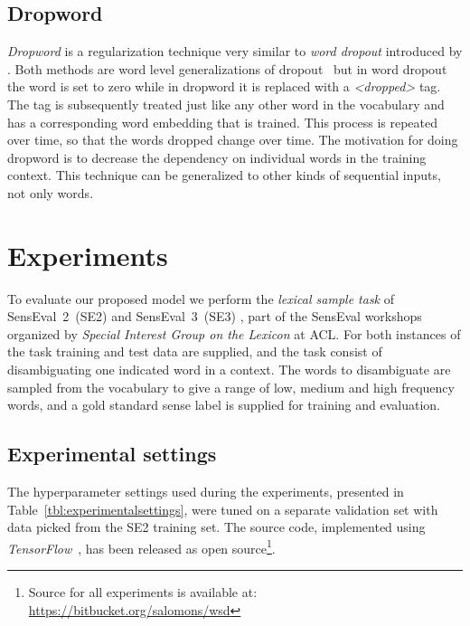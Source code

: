 \documentclass[11pt]{article}
\newcommand{\Tab}[1]{Table~\ref{#1}}
\def\SEtwo{SE2}
\def\SEthree{SE3}
\def\dropword{dropword}
\def\dropout{dropout}
\def\worddropout{word dropout}
\def\dropword{dropword}
\def\Dropword{Dropword}
\begin{document}
\subsection{\Dropword}
\emph{\Dropword{}} is a regularization technique very similar to \emph{\worddropout{}} introduced by . Both methods are word level generalizations of \dropout{}~\cite{srivastava2014dropout} but in \worddropout{} the word is set to zero while in \dropword{} it is replaced with a \emph{\textless dropped\textgreater} tag. The tag is subsequently treated just like any other word in the vocabulary and has a corresponding word embedding that is trained. This process is repeated over time, so that the words dropped change over time. The motivation for doing \dropword{} is to decrease the dependency on individual words in the training context. This technique can be generalized to other kinds of sequential inputs, not only words.  \section{Experiments}
To evaluate our proposed model we perform the \emph{lexical sample task} of SensEval~2~(\SEtwo) \cite{kilgarriff2001english} and  SensEval~3~(\SEthree) \cite{mihalcea2004senseval}, part of the SensEval \cite{kilgarriff2000introduction} workshops organized by \emph{Special Interest Group on the Lexicon} at ACL. For both instances of the task training and test data are supplied, and the task consist of disambiguating one indicated word in a context. The words to disambiguate are sampled from the vocabulary to give a range of low, medium and high frequency words, and a gold standard sense label is supplied for training and evaluation.
\subsection{Experimental settings}

The hyperparameter settings used during the experiments, presented in \Tab{tbl:experimentalsettings}, were tuned on a separate validation set with data picked from the \SEtwo{} training set. The source code, implemented using \emph{TensorFlow}~\cite{tensorflow2015-whitepaper}, has been released as open source\footnote{Source for all experiments is available at: \url{https://bitbucket.org/salomons/wsd}}.
\end{document}
